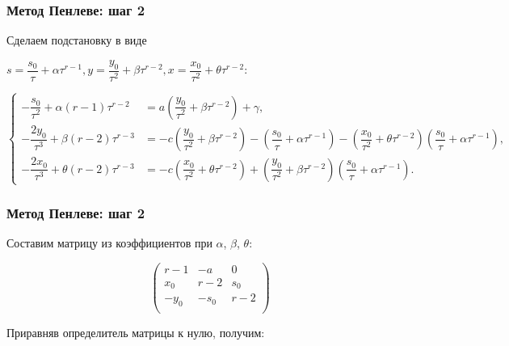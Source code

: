 \documentclass[hyperref={pdftex,unicode}]{beamer}
\begin{document}
\begin{frame}

\frametitle{Метод Пенлеве: шаг 2}

Сделаем подстановку в виде
 
\vspace{10pt}
$ 
s = \dfrac{s_0}{\tau} + \alpha \tau^{r-1},
y = \dfrac{y_0}{\tau^2} + \beta \tau^{r-2},                         x = \dfrac{x_0}{\tau^2} + \theta \tau^{r-2} $:

\tiny{
$$
        \left\{
                \begin{aligned}
                        -\dfrac{s_0}{\tau^{2}} + \alpha (r-1) \tau^{r-2} &= a \left( \dfrac{y_0}{\tau^2} + \beta \tau^{r-2} \right) + \gamma , \\
                        -\dfrac{2y_0}{\tau^{3}} + \beta (r-2) \tau^{r-3} &= -c \left( \dfrac{y_0}{\tau^2} + \beta \tau^{r-2} \right) - \left( \dfrac{s_0}{\tau} + \alpha \tau^{r-1} \right) - \left( \dfrac{x_0}{\tau^2} + \theta \tau^{r-2} \right) \left( \dfrac{s_0}{\tau} + \alpha \tau^{r-1} \right) , \\
                        -\dfrac{2x_0}{\tau^{3}} + \theta (r-2) \tau^{r-3} &= -c \left( \dfrac{x_0}{\tau^2} + \theta \tau^{r-2} \right) + \left( \dfrac{y_0}{\tau^2} + \beta \tau^{r-2} \right) \left( \dfrac{s_0}{\tau} + \alpha \tau^{r-1} \right) .
                \end{aligned}
        \right.
$$
}

\end{frame}



\begin{frame}

\frametitle{Метод Пенлеве: шаг 2}

Составим матрицу из коэффициентов при $ \alpha $, $ \beta $, $ \theta $:

\vspace{10pt}

$$
\left(
                \begin{array}{ccc}
                        r-1 & -a & 0 \\
                        x_0 & r-2 & s_0 \\
                        -y_0 & -s_0 & r-2 \\
                \end{array}
\right)
$$

\vspace{20pt}

Приравняв определитель матрицы к нулю, получим:


\end{frame}
\end{document}

